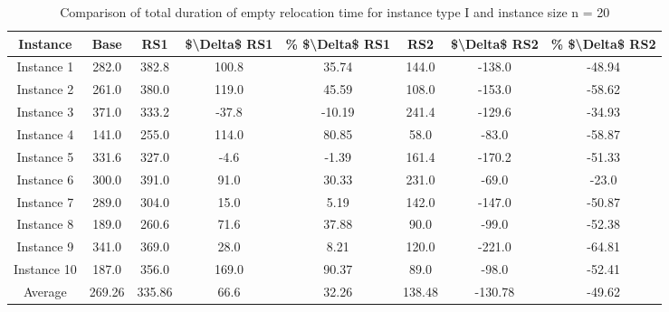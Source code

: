 \begin{table}[H]
\centering
\begin{tabular}{cccccccc}
  \hline
  \textbf{Instance} & \textbf{Base} & \textbf{RS1} & \textbf{\$\textbackslash{}Delta\$  RS1} & \textbf{\% \$\textbackslash{}Delta\$  RS1} & \textbf{RS2} & \textbf{\$\textbackslash{}Delta\$  RS2} & \textbf{\% \$\textbackslash{}Delta\$  RS2} \\\hline
  Instance 1 & 282.0 & 382.8 & 100.8 & 35.74 & 144.0 & -138.0 & -48.94 \\
  Instance 2 & 261.0 & 380.0 & 119.0 & 45.59 & 108.0 & -153.0 & -58.62 \\
  Instance 3 & 371.0 & 333.2 & -37.8 & -10.19 & 241.4 & -129.6 & -34.93 \\
  Instance 4 & 141.0 & 255.0 & 114.0 & 80.85 & 58.0 & -83.0 & -58.87 \\
  Instance 5 & 331.6 & 327.0 & -4.6 & -1.39 & 161.4 & -170.2 & -51.33 \\
  Instance 6 & 300.0 & 391.0 & 91.0 & 30.33 & 231.0 & -69.0 & -23.0 \\
  Instance 7 & 289.0 & 304.0 & 15.0 & 5.19 & 142.0 & -147.0 & -50.87 \\
  Instance 8 & 189.0 & 260.6 & 71.6 & 37.88 & 90.0 & -99.0 & -52.38 \\
  Instance 9 & 341.0 & 369.0 & 28.0 & 8.21 & 120.0 & -221.0 & -64.81 \\
  Instance 10 & 187.0 & 356.0 & 169.0 & 90.37 & 89.0 & -98.0 & -52.41 \\
  Average & 269.26 & 335.86 & 66.6 & 32.26 & 138.48 & -130.78 & -49.62 \\\hline
\end{tabular}
\caption{Comparison of total duration of empty relocation time for instance type I and instance size n = 20}
\label{tab:wait:resrelocation-empty-relocation-comparison_I_20}
\end{table}
